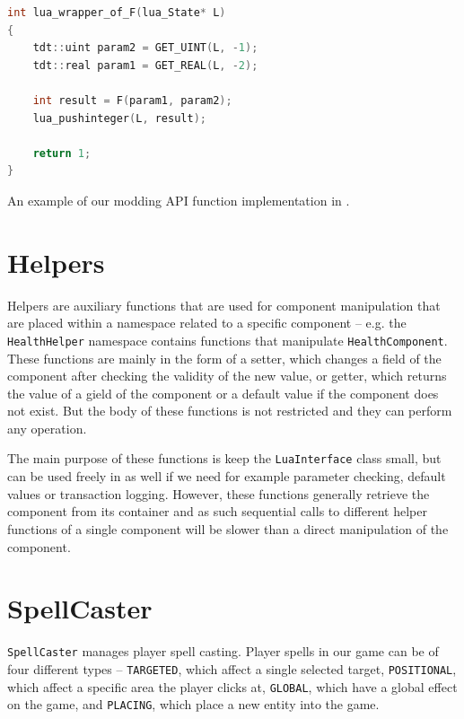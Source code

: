 \begin{listing}[H]
    \centering
    \begin{lstlisting}[language=C++]
int lua_wrapper_of_F(lua_State* L)
{
    tdt::uint param2 = GET_UINT(L, -1);
    tdt::real param1 = GET_REAL(L, -2);

    int result = F(param1, param2);
    lua_pushinteger(L, result);

    return 1;
}
    \end{lstlisting}
    \caption{An example of our modding API function implementation in \protect\cpp.}
    \label{lua-api-ex}
\end{listing}

\section{Helpers}

Helpers are auxiliary functions that are used for component manipulation that are placed within a namespace related to a specific component
-- e.g. the \texttt{HealthHelper} namespace contains functions that manipulate \texttt{HealthComponent}. These functions are mainly in the
form of a setter, which changes a field of the component after checking the validity of the new value, or getter, which returns the value
of a gield of the component or a default value if the component does not exist. But the body of these functions is not restricted and they
can perform any operation.

The main purpose of these functions is keep the \texttt{LuaInterface} class small, but can be used freely in \cpp as well if we need for
example parameter checking, default values or transaction logging. However, these functions generally retrieve the component from its
container and as such sequential calls to different helper functions of a single component will be slower than a direct manipulation
of the component.

\section{SpellCaster}

\texttt{SpellCaster} manages player spell casting. Player spells in our game can be of four different types -- \texttt{TARGETED}, which
affect a single selected target, \texttt{POSITIONAL}, which affect a specific area the player clicks at, \texttt{GLOBAL}, which have a
global effect on the game, and \texttt{PLACING}, which place a new entity into the game.

